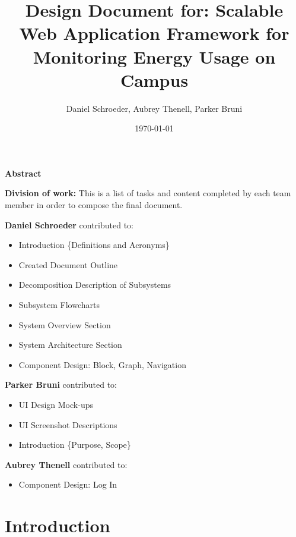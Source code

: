 \documentclass[journal,10pt,onecolumn,compsoc]{IEEEtran}
\title{Design Document for: \linebreak Scalable Web Application Framework for Monitoring Energy Usage on Campus}
\author{Daniel Schroeder, Aubrey Thenell, Parker Bruni}
\date{\today}
\begin{document}
    \maketitle
    \vspace{2cm}
    \begin{center}
    \noindent \textbf{Abstract} \\
                \indent 
                
                
    \end{center}         
    
    \newpage
    \tableofcontents
    \newpage
    \noindent\textbf{Division of work:}
    \noindent This is a list of tasks and content completed by each team member in order to compose the final document.
    
    \noindent\textbf{Daniel Schroeder} contributed to: 
    \begin{itemize}
        \item Introduction \{Definitions and Acronyms\}
        \item Created Document Outline 
        \item Decomposition Description of Subsystems
        \item Subsystem Flowcharts
        \item System Overview Section
        \item System Architecture Section
        \item Component Design: Block, Graph, Navigation
    \end{itemize}
    \noindent\textbf{Parker Bruni} contributed to:
    \begin{itemize}
        \item UI Design Mock-ups
        \item UI Screenshot Descriptions
        \item Introduction \{Purpose, Scope\}
    \end{itemize}
    \noindent\textbf{Aubrey Thenell} contributed to:
    \begin{itemize} 
      \item Component Design: Log In
    \end{itemize}
    
    \newpage
    
    \section{Introduction}
\end{document}
